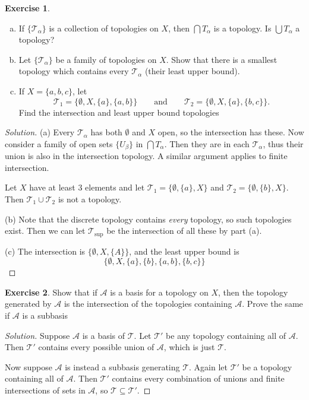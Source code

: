 \documentclass{article}
\theoremstyle{definition}
\newtheorem{exercise}{Exercise}[section]
\begin{document}
\begin{exercise}
  \begin{enumerate}[(a)]
    \item If $\{\mathcal{T}_\alpha\}$ is a collection of topologies on $X$, then $\bigcap T_\alpha$ is a topology. Is $\bigcup T_\alpha$ a topology?
    \item Let $\{\mathcal{T}_\alpha\}$ be a family of topologies on $X$. Show that there is a smallest topology which contains every $\mathcal{T}_\alpha$ (their least upper bound).
    \item If $X = \{a,b,c\}$, let
    $$\mathcal{T}_1 = \{\emptyset, X, \{a\}, \{a,b\}\} \qquad\text{and}\qquad \mathcal{T}_2 = \{\emptyset, X, \{a\}, \{b,c\}\}.$$
    Find the intersection and least upper bound topologies
  \end{enumerate}
\end{exercise}
\begin{proof}[Solution]
  (a) Every $\mathcal{T}_\alpha$ has both $\emptyset$ and $X$ open, so the intersection has these. Now consider a family of open sets $\{U_\beta\}$ in $\bigcap T_\alpha$. Then they are in each $\mathcal{T}_\alpha$, thus their union is also in the intersection topology. A similar argument applies to finite intersection.

  Let $X$ have at least 3 elements and let $\mathcal{T}_1 = \{\emptyset, \{a\}, X\}$ and $\mathcal{T}_2 = \{\emptyset, \{b\}, X\}$. Then $\mathcal{T}_1\cup\mathcal{T}_2$ is not a topology.

  (b) Note that the discrete topology contains \textit{every} topology, so such topologies exist. Then we can let $\mathcal{T}_{\sup}$ be the intersection of all these by part (a).

  (c) The intersection is $\{\emptyset, X, \{A\}\}$, and the least upper bound is $$\{\emptyset, X, \{a\}, \{b\}, \{a,b\}, \{b,c\}\}$$
\end{proof}

\begin{exercise}
  Show that if $\mathcal{A}$ is a basis for a topology on $X$, then the topology generated by $\mathcal{A}$ is the intersection of the topologies containing $\mathcal{A}$. Prove the same if $\mathcal{A}$ is a subbasis
\end{exercise}
\begin{proof}[Solution]
  Suppose $\mathcal{A}$ is a basis of $\mathcal{T}$. Let $\mathcal{T}'$ be any topology containing all of $\mathcal{A}$. Then $\mathcal{T}'$ contains every possible union of $\mathcal{A}$, which is just $\mathcal{T}$.

  Now suppose $\mathcal{A}$ is instead a subbasis generating $\mathcal{T}$. Again let $\mathcal{T}'$ be a topology containing all of $\mathcal{A}$. Then $\mathcal{T}'$ contains every combination of unions and finite intersections of sets in $\mathcal{A}$, so $\mathcal{T}\subseteq\mathcal{T}'$.
\end{proof}
\end{document}
